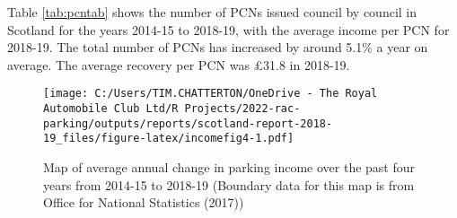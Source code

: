 \documentclass[
  12pt,
]{article}
\begin{document}
Table \ref{tab:pcntab} shows the number of PCNs issued council by council in Scotland for the years 2014-15 to 2018-19, with the average income per PCN for 2018-19. The total number of PCNs has increased by around 5.1\% a year on average. The average recovery per PCN was £31.8 in 2018-19.

\begin{figure}
\centering
\texttt{[image: C:/Users/TIM.CHATTERTON/OneDrive - The Royal Automobile Club Ltd/R Projects/2022-rac-parking/outputs/reports/scotland-report-2018-19\_files/figure-latex/incomefig4-1.pdf]}
\caption{\label{fig:incomefig4}Map of average annual change in parking income over the past four years from 2014-15 to 2018-19 (Boundary data for this map is from Office for National Statistics (2017))}
\end{figure}

\newpage

\pagebreak

\begingroup\fontsize{10}{12}\selectfont
\end{document}
